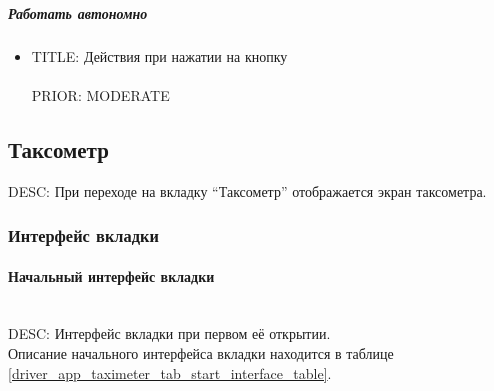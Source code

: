           \subparagraph{Работать автономно} \label{authorization_functional_autonom}

            \begin{itemize}
              \item{
                TITLE: Действия при нажатии на кнопку\\
                \\
                PRIOR: MODERATE\\}
            \end{itemize}

  \subsection{Таксометр} \label{driver_app_taximeter_tab}

    DESC: При переходе на вкладку “Таксометр” отображается экран таксометра.

    \subsubsection{Интерфейс вкладки}

      \paragraph{Начальный интерфейс вкладки} \mbox{}\\ \label{driver_app_taximeter_tab_start_interface}
        DESC: Интерфейс вкладки при первом её открытии. \\
        Описание начального интерфейса вкладки находится в таблице \ref{driver_app_taximeter_tab_start_interface_table}.\\

